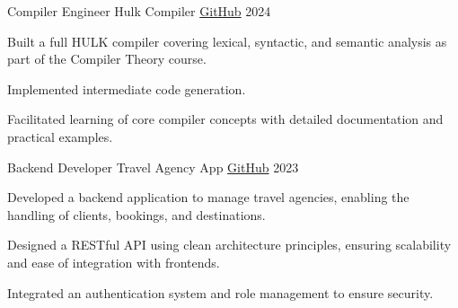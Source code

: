 \begin{cventries}
{\begin{cvitems}
      \end{cvitems}
    }
  \cventry
    {Compiler Engineer}
    {Hulk Compiler}
    {\href{https://github.com/alexsierra45/hulk-compiler}{GitHub}}
    {2024}
    {
      \begin{cvitems}
        \item {Built a full HULK compiler covering lexical, syntactic, and semantic analysis as part of the Compiler Theory course.}
        \item {Implemented intermediate code generation.}
        \item {Facilitated learning of core compiler concepts with detailed documentation and practical examples.}
      \end{cvitems}
    }

    \cventry
    {Backend Developer}
    {Travel Agency App}
    {\href{https://github.com/alexsierra45/travel-agency}{GitHub}}
    {2023}
    {
      \begin{cvitems}
        \item {Developed a backend application to manage travel agencies, enabling the handling of clients, bookings, and destinations.}
        \item {Designed a RESTful API using clean architecture principles, ensuring scalability and ease of integration with frontends.}
        \item {Integrated an authentication system and role management to ensure security.}
      \end{cvitems}
    }
\end{cventries}
